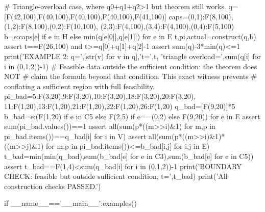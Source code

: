 \documentclass[11pt,a4paper]{ctexart}
\theoremstyle{remark}\newtheorem{remark}[theorem]{备注}
\begin{document}
\begin{CodeListing}
    # Triangle-overload case, where q0+q1+q2>1 but theorem still works.
    q=[F(42,100),F(40,100),F(40,100),F(40,100),F(41,100)]
    caps={(0,1):F(8,100),(1,2):F(8,100),(0,2):F(10,100),
          (2,3):F(4,100),(3,4):F(4,100),(0,4):F(5,100)}
    b={e:caps[e] if e in H else min(q[e[0]],q[e[1]]) for e in E}
    t,pi,actual=construct(q,b)
    assert t==F(26,100) and t>=q[0]+q[1]+q[2]-1
    assert sum(q)-3*min(q)<=1
    print('EXAMPLE 2: q=',[str(v) for v in q],'t=',t,
          'triangle overload=',sum(q[i] for i in (0,1,2))-1)
    # Feasible data outside the sufficient condition: the theorem does NOT
    # claim the formula beyond that condition.  This exact witness prevents
    # conflating a sufficient region with full feasibility.
    pi_bad={5:F(3,20),9:F(3,20),10:F(3,20),18:F(3,20),20:F(3,20),
            11:F(1,20),13:F(1,20),21:F(1,20),22:F(1,20),26:F(1,20)}
    q_bad=[F(9,20)]*5
    b_bad={e:(F(1,20) if e in C5 else F(2,5) if e==(0,2)
              else F(9,20)) for e in E}
    assert sum(pi_bad.values())==1
    assert all(sum(p*((m>>i)&1) for m,p in pi_bad.items())==q_bad[i]
               for i in V)
    assert all(sum(p*((m>>i)&1)*((m>>j)&1) for m,p in pi_bad.items())<=b_bad[i,j]
               for i,j in E)
    t_bad=min(min(q_bad),sum(b_bad[e] for e in C3),sum(b_bad[e] for e in C5))
    assert t_bad==F(1,4)<sum(q_bad[i] for i in (0,1,2))-1
    print('BOUNDARY CHECK: feasible but outside sufficient condition, t=',t_bad)
    print('All construction checks PASSED.')

if __name__=='__main__':examples()
\end{CodeListing}
\end{document}
